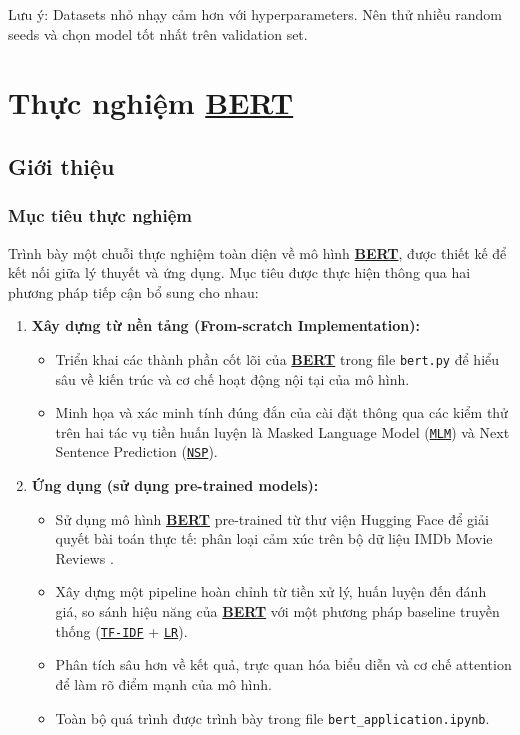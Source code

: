 Lưu ý: Datasets nhỏ nhạy cảm hơn với hyperparameters. Nên thử nhiều random seeds và chọn model tốt nhất trên validation set.

\section{Thực nghiệm \hyperref[acro:bert]{\textbf{BERT}}}
\label{sec:thuc_nghiem_bert}

\subsection{Giới thiệu}
\label{ssec:gioi_thieu_thuc_nghiem}

\subsubsection{Mục tiêu thực nghiệm}
Trình bày một chuỗi thực nghiệm toàn diện về mô hình \hyperref[acro:bert]{\textbf{BERT}}, được thiết kế để kết nối giữa lý thuyết và ứng dụng. Mục tiêu được thực hiện thông qua hai phương pháp tiếp cận bổ sung cho nhau:

\begin{enumerate}
    \item \textbf{Xây dựng từ nền tảng (From-scratch Implementation):} 
    \begin{itemize}
        \item Triển khai các thành phần cốt lõi của \hyperref[acro:bert]{\textbf{BERT}} trong file \texttt{bert.py} để hiểu sâu về kiến trúc và cơ chế hoạt động nội tại của mô hình.
        \item Minh họa và xác minh tính đúng đắn của cài đặt thông qua các kiểm thử trên hai tác vụ tiền huấn luyện là Masked Language Model (\hyperref[acro:mlm]{\texttt{MLM}}) và Next Sentence Prediction (\hyperref[acro:nsp]{\texttt{NSP}}).
    \end{itemize}
    \item \textbf{Ứng dụng (sử dụng pre-trained models):} 
    \begin{itemize}
        \item Sử dụng mô hình \hyperref[acro:bert]{\textbf{BERT}} pre-trained từ thư viện Hugging Face để giải quyết bài toán thực tế: phân loại cảm xúc trên bộ dữ liệu IMDb Movie Reviews \cite{maas2011learning}.
        \item Xây dựng một pipeline hoàn chỉnh từ tiền xử lý, huấn luyện đến đánh giá, so sánh hiệu năng của \hyperref[acro:bert]{\textbf{BERT}} với một phương pháp baseline truyền thống (\hyperref[acro:tfidf]{\texttt{TF-IDF}} + \hyperref[acro:lr]{\texttt{LR}}).
        \item Phân tích sâu hơn về kết quả, trực quan hóa biểu diễn và cơ chế attention để làm rõ điểm mạnh của mô hình.
        \item Toàn bộ quá trình được trình bày trong file \texttt{bert\_application.ipynb}.
    \end{itemize}
\end{enumerate}

